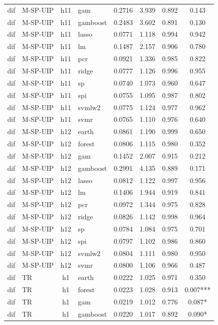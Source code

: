 \begin{ThreePartTable}
\begin{longtable}[t]{llclcccc}
dif & M-SP-UIP & h11 & gam & 0.2716 & 3.939 & 0.892 & 0.143\\
dif & M-SP-UIP & h11 & gamboost & 0.2483 & 3.602 & 0.891 & 0.130\\
dif & M-SP-UIP & h11 & lasso & 0.0771 & 1.118 & 0.994 & 0.942\\
dif & M-SP-UIP & h11 & lm & 0.1487 & 2.157 & 0.906 & 0.780\\
dif & M-SP-UIP & h11 & pcr & 0.0921 & 1.336 & 0.985 & 0.822\\
dif & M-SP-UIP & h11 & ridge & 0.0777 & 1.126 & 0.996 & 0.955\\
dif & M-SP-UIP & h11 & sp & 0.0740 & 1.073 & 0.960 & 0.647\\
dif & M-SP-UIP & h11 & spi & 0.0755 & 1.095 & 0.987 & 0.802\\
dif & M-SP-UIP & h11 & svmlw2 & 0.0775 & 1.124 & 0.977 & 0.962\\
dif & M-SP-UIP & h11 & svmr & 0.0765 & 1.110 & 0.976 & 0.640\\
\addlinespace
dif & M-SP-UIP & h12 & earth & 0.0861 & 1.190 & 0.999 & 0.650\\
dif & M-SP-UIP & h12 & forest & 0.0806 & 1.115 & 0.980 & 0.352\\
dif & M-SP-UIP & h12 & gam & 0.1452 & 2.007 & 0.915 & 0.212\\
dif & M-SP-UIP & h12 & gamboost & 0.2991 & 4.135 & 0.889 & 0.171\\
dif & M-SP-UIP & h12 & lasso & 0.0812 & 1.122 & 0.997 & 0.956\\
dif & M-SP-UIP & h12 & lm & 0.1406 & 1.944 & 0.919 & 0.841\\
dif & M-SP-UIP & h12 & pcr & 0.0972 & 1.344 & 0.975 & 0.828\\
dif & M-SP-UIP & h12 & ridge & 0.0826 & 1.142 & 0.998 & 0.964\\
dif & M-SP-UIP & h12 & sp & 0.0784 & 1.084 & 0.975 & 0.701\\
dif & M-SP-UIP & h12 & spi & 0.0797 & 1.102 & 0.986 & 0.860\\
dif & M-SP-UIP & h12 & svmlw2 & 0.0804 & 1.111 & 0.980 & 0.950\\
dif & M-SP-UIP & h12 & svmr & 0.0800 & 1.106 & 0.966 & 0.487\\
\addlinespace
dif & TR & h1 & earth & 0.0222 & 1.025 & 0.971 & 0.350\\
dif & TR & h1 & forest & 0.0223 & 1.028 & 0.913 & 0.007***\\
dif & TR & h1 & gam & 0.0219 & 1.012 & 0.776 & 0.087*\\
dif & TR & h1 & gamboost & 0.0220 & 1.017 & 0.892 & 0.090*\\

\end{longtable}
\end{ThreePartTable}
